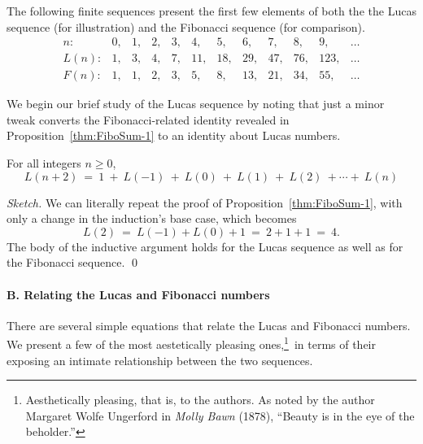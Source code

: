 \medskip

The following finite sequences present the first few elements of both
the the Lucas sequence (for illustration) and the Fibonacci sequence
(for comparison).
\[
\begin{array}{r|rrrrrrrrrrr}
n: &
 0, & 1, & 2, & 3, &  4, &  5, &  6, &  7, &  8, &   9, & \ldots \\
\hline
L(n): &
 1, & 3, & 4, & 7, & 11, & 18, & 29, & 47, & 76, & 123, & \ldots \\
F(n): &
 1, & 1, & 2, & 3, &  5, &  8, & 13, & 21, & 34, &  55, & \ldots
\end{array}
\]

We begin our  brief study of the Lucas sequence by noting that just a
minor tweak converts the Fibonacci-related identity revealed in
Proposition~\ref{thm:FiboSum-1} to an identity about Lucas numbers.

\begin{prop}
\label{thm:LucasSum-1}
For all integers $n \geq 0$,
\begin{equation}
\label{eq:multilinear-Lucas-1}
L(n+2) \ = \
1 \ + \ L(-1) \ + \ L(0) \ + \ L(1) \ + \ L(2) \ + \cdots + \ L(n)
\end{equation}
\end{prop}

\begin{proof}[Sketch]
We can literally repeat the proof of Proposition~\ref{thm:FiboSum-1},
with only a change in the induction's base case, which becomes
\[ L(2) \ = \ L(-1) + L(0) + 1 \ = \ 2 + 1 + 1 \ = \ 4. \]
The body of the inductive argument holds for the Lucas sequence as
well as for the Fibonacci sequence.
\qed
\end{proof}

\paragraph{\small\sf B. Relating the Lucas and Fibonacci numbers}

There are several simple equations that relate the Lucas and Fibonacci
numbers.  We present a few of the most aestetically pleasing
ones,\footnote{Aesthetically pleasing, that is, to the authors.  As
  noted by the author Margaret Wolfe Ungerford in {\it Molly Bawn}
  (1878),\index{Ungerford, Margaret Wolfe} ``Beauty is in the eye of
  the beholder.''}~in terms of their exposing an intimate
relationship between the two sequences.

